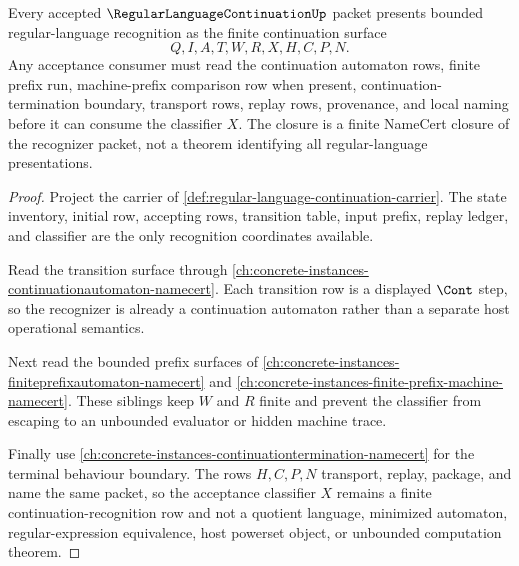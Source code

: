 \begin{theorem}
\label{thm:regular-language-continuation-closure}
Every accepted $\RegularLanguageContinuationUp$ packet presents bounded regular-language recognition as the finite continuation surface
$$
Q,I,A,T,W,R,X,H,C,P,N .
$$
Any acceptance consumer must read the continuation automaton rows, finite prefix run, machine-prefix comparison row when present, continuation-termination boundary, transport rows, replay rows, provenance, and local naming before it can consume the classifier $X$. The closure is a finite NameCert closure of the recognizer packet, not a theorem identifying all regular-language presentations.
\end{theorem}
\begin{proof}
Project the carrier of \autoref{def:regular-language-continuation-carrier}. The state inventory, initial row, accepting rows, transition table, input prefix, replay ledger, and classifier are the only recognition coordinates available.

Read the transition surface through \autoref{ch:concrete-instances-continuationautomaton-namecert}. Each transition row is a displayed $\Cont$ step, so the recognizer is already a continuation automaton rather than a separate host operational semantics.

Next read the bounded prefix surfaces of \autoref{ch:concrete-instances-finiteprefixautomaton-namecert} and \autoref{ch:concrete-instances-finite-prefix-machine-namecert}. These siblings keep $W$ and $R$ finite and prevent the classifier from escaping to an unbounded evaluator or hidden machine trace.

Finally use \autoref{ch:concrete-instances-continuationtermination-namecert} for the terminal behaviour boundary. The rows $H,C,P,N$ transport, replay, package, and name the same packet, so the acceptance classifier $X$ remains a finite continuation-recognition row and not a quotient language, minimized automaton, regular-expression equivalence, host powerset object, or unbounded computation theorem.
\end{proof}



